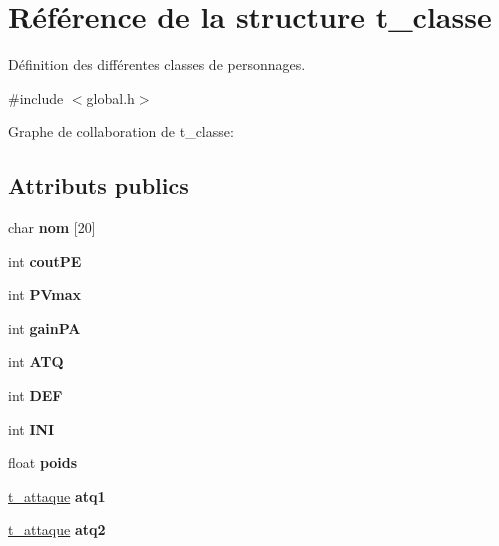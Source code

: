 \hypertarget{a00003}{}\section{Référence de la structure t\+\_\+classe}
\label{a00003}


Définition des différentes classes de personnages.  




{\ttfamily \#include $<$global.\+h$>$}



Graphe de collaboration de t\+\_\+classe\+:
\subsection*{Attributs publics}
\begin{DoxyCompactItemize}
\item 
char {\bfseries nom} \mbox{[}20\mbox{]}\hypertarget{a00003_ab0080d83cb0a2a9ceb8f05dfba32eb99}{}\label{a00003_ab0080d83cb0a2a9ceb8f05dfba32eb99}

\item 
int {\bfseries cout\+PE}\hypertarget{a00003_ac6a9f7551a009405a9fe75130c75ea74}{}\label{a00003_ac6a9f7551a009405a9fe75130c75ea74}

\item 
int {\bfseries P\+Vmax}\hypertarget{a00003_a4694d05e9b9fa7deba7e67dc0c093851}{}\label{a00003_a4694d05e9b9fa7deba7e67dc0c093851}

\item 
int {\bfseries gain\+PA}\hypertarget{a00003_aa2be187b419f9e884889ee3a59a56e8a}{}\label{a00003_aa2be187b419f9e884889ee3a59a56e8a}

\item 
int {\bfseries A\+TQ}\hypertarget{a00003_a13807c477ce6b05bc07fa27d8224c4c0}{}\label{a00003_a13807c477ce6b05bc07fa27d8224c4c0}

\item 
int {\bfseries D\+EF}\hypertarget{a00003_a7557c6f15618a9e93e9f928f6c5181bf}{}\label{a00003_a7557c6f15618a9e93e9f928f6c5181bf}

\item 
int {\bfseries I\+NI}\hypertarget{a00003_a9bc332f2c45ee66f04571b0470a56899}{}\label{a00003_a9bc332f2c45ee66f04571b0470a56899}

\item 
float {\bfseries poids}\hypertarget{a00003_aae98a775f3eec5f23b41616c66b2dcfb}{}\label{a00003_aae98a775f3eec5f23b41616c66b2dcfb}

\item 
\hyperlink{a00002}{t\+\_\+attaque} {\bfseries atq1}\hypertarget{a00003_afee4c531e910b8bd686953747c9ec56c}{}\label{a00003_afee4c531e910b8bd686953747c9ec56c}

\item 
\hyperlink{a00002}{t\+\_\+attaque} {\bfseries atq2}\hypertarget{a00003_aac3cf4fe6b81f0c19e523fc11b6573f3}{}\label{a00003_aac3cf4fe6b81f0c19e523fc11b6573f3}

\end{DoxyCompactItemize}


